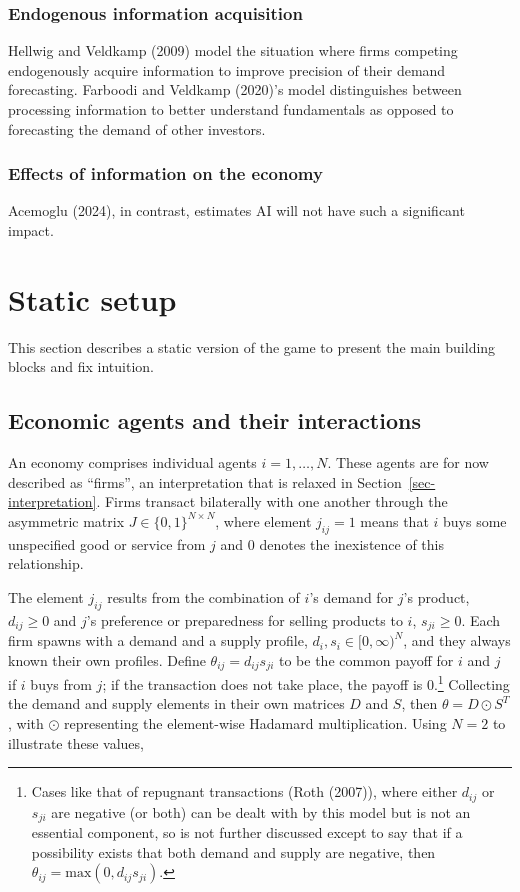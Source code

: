 \documentclass[
]{article}
\theoremstyle{definition}
\theoremstyle{plain}
\theoremstyle{remark}
\begin{document}
\subsubsection{Endogenous information
acquisition}\label{endogenous-information-acquisition}

Hellwig and Veldkamp (2009) model the situation where firms competing
endogenously acquire information to improve precision of their demand
forecasting. Farboodi and Veldkamp (2020)'s model distinguishes between
processing information to better understand fundamentals as opposed to
forecasting the demand of other investors.

\subsubsection{Effects of information on the
economy}\label{effects-of-information-on-the-economy}

Acemoglu (2024), in contrast, estimates AI will not have such a
significant impact.

\section{Static setup}\label{static-setup}

This section describes a static version of the game to present the main
building blocks and fix intuition.

\subsection{Economic agents and their
interactions}\label{economic-agents-and-their-interactions}

An economy comprises individual agents \(i = 1, \dots, N\). These agents
are for now described as ``firms'', an interpretation that is relaxed in
Section~\ref{sec-interpretation}. Firms transact bilaterally with one
another through the asymmetric matrix \(J \in \{0, 1\}^{N \times N}\),
where element \(j_{ij} = 1\) means that \(i\) buys some unspecified good
or service from \(j\) and \(0\) denotes the inexistence of this
relationship.

The element \(j_{ij}\) results from the combination of \(i\)'s demand
for \(j\)'s product, \(d_{ij} \geq 0\) and \(j\)'s preference or
preparedness for selling products to \(i\), \(s_{ji} \geq 0\). Each firm
spawns with a demand and a supply profile,
\(d_i, s_i \in [0, \infty)^N\), and they always known their own
profiles. Define \(\theta_{ij} = d_{ij} s_{ji}\) to be the common payoff
for \(i\) and \(j\) if \(i\) buys from \(j\); if the transaction does
not take place, the payoff is \(0\).\footnote{Cases like that of
  repugnant transactions (Roth (2007)), where either \(d_{ij}\) or
  \(s_{ji}\) are negative (or both) can be dealt with by this model but
  is not an essential component, so is not further discussed except to
  say that if a possibility exists that both demand and supply are
  negative, then \(\theta_{ij} = \text{max}(0, d_{ij} s_{ji})\).}
Collecting the demand and supply elements in their own matrices \(D\)
and \(S\), then \(\theta = D \odot S^T\), with \(\odot\) representing
the element-wise Hadamard multiplication. Using \(N=2\) to illustrate
these values,
\end{document}
